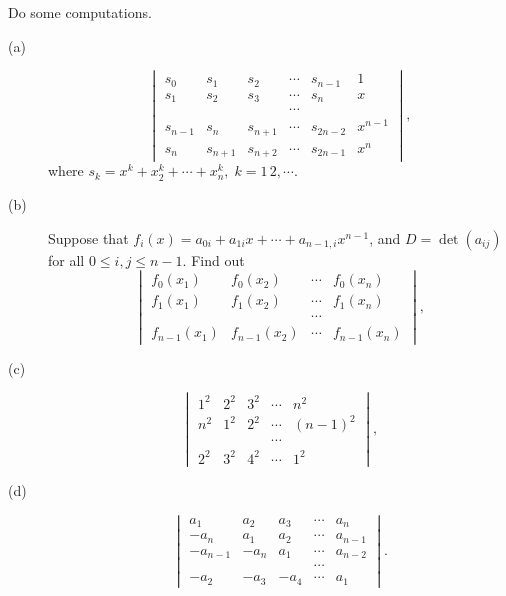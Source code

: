 \begin{pro}%
	Do some computations.
	\begin{description}
		\item[(a)]
		\[\begin{vmatrix}s_0&s_1&s_2&\cdots&s_{n-1}&1\\s_1&s_2&s_3&\cdots&s_n&x\\
		& & &\cdots& &\\s_{n-1}&s_n&s_{n+1}&\cdots&s_{2n-2}&x^{n-1}\\
		s_n&s_{n+1}&s_{n+2}&\cdots&s_{2n-1}&x^n\end{vmatrix},\]
		where $s_k=x^k+x_2^k+\cdots+x_n^k,\;k=1\,2,\cdots$.
		\item[(b)]
		Suppose that $f_i(x)=a_{0i}+a_{1i}x+\cdots+a_{n-1,i}x^{n-1}$, and
		$D=\det(a_{ij})$ for all $0\leq i,j\leq n-1$. Find out
		\[\begin{vmatrix}f_0(x_1)&f_0(x_2)&\cdots&f_0(x_n)\\
						   f_1(x_1)&f_1(x_2)&\cdots&f_1(x_n)\\
						   & &\cdots& \\
						   f_{n-1}(x_1)&f_{n-1}(x_2)&\cdots&f_{n-1}(x_n)
		\end{vmatrix},\]
		\item[(c)]
		\[\begin{vmatrix}1^2&2^2&3^2&\cdots&n^2\\n^2&1^2&2^2&\cdots&(n-1)^2\\
		 & & &\cdots&\\2^2&3^2&4^2&\cdots&1^2\end{vmatrix},\]
		 \item[(d)]
		 \[\begin{vmatrix}a_1&a_2&a_3&\cdots&a_n\\
		 -a_n&a_1&a_2&\cdots&a_{n-1}\\-a_{n-1}&-a_n&a_1&\cdots&a_{n-2}\\
		 & & &\cdots&\\-a_2&-a_3&-a_4&\cdots&a_1\end{vmatrix}.\]
	\end{description}
\end{pro}
